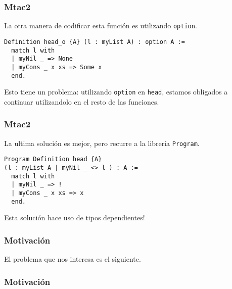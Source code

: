 \documentclass{beamer}
\begin{document}
\begin{frame}[fragile]
\frametitle{Mtac2}

La otra manera de codificar esta función es utilizando \lstinline{option}.

\begin{lstlisting}
Definition head_o {A} (l : myList A) : option A :=
  match l with
  | myNil _ => None
  | myCons _ x xs => Some x
  end.
\end{lstlisting}

Esto tiene un problema: utilizando \lstinline{option} en \lstinline{head}, estamos obligados a continuar utilizandolo en el resto de las funciones.

\end{frame}

\begin{frame}[fragile]
\frametitle{Mtac2}

La ultima solución es mejor, pero recurre a la librería \lstinline{Program}.

\begin{lstlisting}
Program Definition head {A}
(l : myList A | myNil _ <> l ) : A :=
  match l with
  | myNil _ => !
  | myCons _ x xs => x
  end.
\end{lstlisting}

Esta solución hace uso de tipos dependientes!
\end{frame}

\begin{frame}
\frametitle{Motivación}

El problema que nos interesa es el siguiente.



\end{frame}

\begin{frame}
\frametitle{Motivación}
\end{frame}
\end{document}
